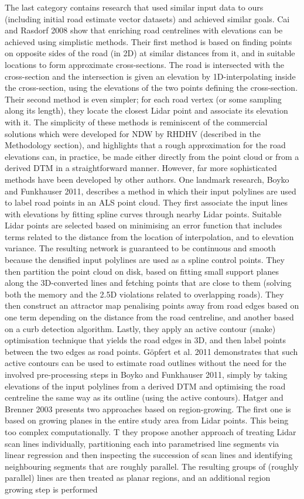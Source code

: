 The last category contains research that used similar input data to ours (including initial road estimate vector datasets) and achieved similar goals. Cai and Rasdorf 2008 show that enriching road centrelines with elevations can be achieved using simplistic methods. Their first method is based on finding points on opposite sides of the road (in 2D) at similar distances from it, and in suitable locations to form approximate cross-sections. The road is intersected with the cross-section and the intersection is given an elevation by 1D-interpolating inside the cross-section, using the elevations of the two points defining the cross-section. Their second method is even simpler; for each road vertex  (or some sampling along its length), they locate the closest Lidar point and associate its elevation with it. The simplicity of these methods is reminiscent of the commercial solutions which were developed for NDW by RHDHV (described in the Methodology section), and highlights that a rough approximation for the road elevations can, in practice, be made either directly from the point cloud or from a derived DTM in a straightforward manner. However, far more sophisticated methods have been developed by other authors. One landmark research, Boyko and Funkhauser 2011, describes a method in which their input polylines are used to label road points in an ALS point cloud. They first associate the input lines with elevations by fitting spline curves through nearby Lidar points. Suitable Lidar points are selected based on minimising an error function that includes terms related to the distance from the location of interpolation, and to elevation variance. The resulting network is guaranteed to be continuous and smooth because the densified input polylines are used as a spline control points. They then partition the point cloud on disk, based on fitting small support planes along the 3D-converted lines and fetching points that are close to them (solving both the memory and the 2.5D violations related to overlapping roads). They then construct an attractor map penalising points away from road edges based on one term depending on the distance from the road centreline, and another based on a curb detection algorithm. Lastly, they apply an active contour (snake) optimisation technique that yields the road edges in 3D, and then label points between the two edges as road points. Göpfert et al. 2011 demonstrates that such active contours can be used to estimate road outlines without the need for the involved pre-processing steps in Boyko and Funkhauser 2011, simply by taking elevations of the input polylines from a derived DTM and optimising the road centreline the same way as its outline (using the active contours). Hatger and Brenner 2003 presents two approaches based on region-growing. The first one is based on growing planes in the entire study area from Lidar points. This being too complex computationally. T they propose another approach of treating Lidar scan lines individually, partitioning each into parametrised line segments via linear regression and then inspecting the succession of scan lines and identifying neighbouring segments that are roughly parallel. The resulting groups of (roughly parallel) lines are then treated as planar regions, and an additional region growing step is performed 
